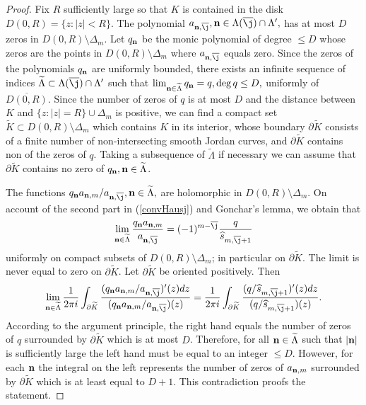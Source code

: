 \documentclass[10pt,a4paper]{article}
\theoremstyle{definition}
\theoremstyle{remark}
\numberwithin{equation}{section}
\begin{document}
\begin{proof}
Fix $R$ sufficiently large so that $K$ is contained in the disk $D(0,R) = \{z:|z| < R\}$. The polynomial $a_{{\bf n},\overline{\j}}, {\bf n} \in \Lambda(\overline{\j}) \cap \Lambda^{\prime},$ has at most $D$ zeros in $D(0,R) \setminus \Delta_m$. Let $q_{\bf n}$ be the monic polynomial of degree $\leq D$ whose zeros are the points in $D(0,R) \setminus \Delta_m$ where $a_{{\bf n},\overline{\j}}$ equals zero. Since the zeros of the polynomials $q_{\bf n}$ are uniformly bounded, there exists an infinite sequence of indices $\widetilde{\Lambda} \subset \Lambda(\overline{\j}) \cap \Lambda^{\prime}$ such that $\lim_{{\bf n} \in \widetilde{\Lambda}}q_{\bf n} = q, \deg q \leq D,$ uniformly of $\overline{D(0,R)}$. Since the number of zeros of $q$ is at most $D$ and the distance between $K$ and $\{z:|z|= R\} \cup \Delta_m$ is positive, we can find a compact set $\widetilde{K} \subset D(0,R) \setminus \Delta_m$ which contains $K$ in its interior, whose boundary $\partial \widetilde{K}$  consists of a finite number of non-intersecting smooth Jordan curves, and $\partial \widetilde{K}$ contains non of the zeros of $q$. Taking a subsequence of $\widetilde{\Lambda}$ if necessary we can assume that $\partial \widetilde{K}$ contains no zero of $q_{\bf n}, {\bf n} \in \widetilde{\Lambda}$.

The functions ${q_{\bf n} a_{{\bf n},m}}/{a_{{\bf n},\overline{\j}}}, {\bf n} \in \widetilde{\Lambda},$ are holomorphic in $D(0,R) \setminus \Delta_m$. On account of the second part in (\ref{convHausj}) and Gonchar's lemma, we obtain that
\[ \lim_{{\bf n} \in \widetilde{\Lambda}} \frac{q_{\bf n} a_{{\bf n},m}}{a_{{\bf n},\overline{\j}}} =  (-1)^{m - \overline{\j}} \frac{q}{\widehat{s}_{m,\overline{\j} +1}}
\]
uniformly on compact subsets of $D(0,R) \setminus \Delta_m$; in particular on $\partial \widetilde{K}$. The limit is never equal to zero on $\partial \widetilde{K}$. Let $\partial \widetilde{K}$ be oriented positively. Then
\[ \lim_{{\bf n} \in \widetilde{\Lambda}}  \frac{1}{2\pi i} \int_{\partial \widetilde{K}} \frac{({q_{\bf n} a_{{\bf n},m}}/{a_{{\bf n},\overline{\j}}})^{\prime}(z)dz}{ ({q_{\bf n} a_{{\bf n},m}}/{a_{{\bf n},\overline{\j}}})(z)} = \frac{1}{2\pi i}\int_{\partial \widetilde{K}}
\frac{({q}/{\widehat{s}_{m,\overline{\j} +1}})^{\prime}(z) dz}{ ({q}/{\widehat{s}_{m,\overline{\j} +1}})(z)}.
\]
According to the argument principle, the right hand equals the number of zeros of $q$ surrounded by $\partial \widetilde{K}$ which is at most $D$. Therefore, for all ${\bf n} \in \widetilde{\Lambda}$ such that $|{\bf n}|$ is sufficiently large the left hand must be equal to an integer $\leq D$. However, for each ${\bf n}$ the integral on the left represents the number of zeros of $a_{{\bf n},m}$ surrounded by $\partial \widetilde{K}$ which is at least equal to $D+1$. This contradiction proofs the statement.


\end{proof}
\end{document}
